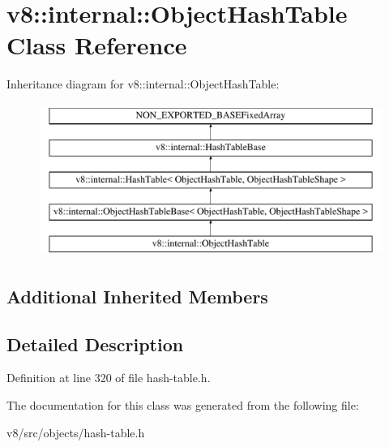 \hypertarget{classv8_1_1internal_1_1ObjectHashTable}{}\section{v8\+:\+:internal\+:\+:Object\+Hash\+Table Class Reference}
\label{classv8_1_1internal_1_1ObjectHashTable}
Inheritance diagram for v8\+:\+:internal\+:\+:Object\+Hash\+Table\+:\begin{figure}[H]
\begin{center}
\leavevmode
\includegraphics[height=5.000000cm]{classv8_1_1internal_1_1ObjectHashTable}
\end{center}
\end{figure}
\subsection*{Additional Inherited Members}


\subsection{Detailed Description}


Definition at line 320 of file hash-\/table.\+h.



The documentation for this class was generated from the following file\+:\begin{DoxyCompactItemize}
\item 
v8/src/objects/hash-\/table.\+h\end{DoxyCompactItemize}
